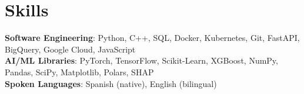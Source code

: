 \documentclass[letterpaper,11pt]{article}
\begin{document}
\section{Skills}
 \begin{itemize}[leftmargin=0.15in, label={}]
    \small{\item{
     \textbf{Software Engineering}{: Python, C++, SQL, Docker, Kubernetes, Git, FastAPI, BigQuery, Google Cloud, JavaScript} \\
     \textbf{AI/ML Libraries}{: PyTorch, TensorFlow, Scikit-Learn, XGBoost, NumPy, Pandas, SciPy, Matplotlib, Polars, SHAP} \\
     \textbf{Spoken Languages}{: Spanish (native), English (bilingual)} \\
    }}
 \end{itemize}
\end{document}
